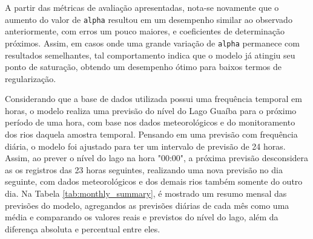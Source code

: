 A partir das métricas de avaliação apresentadas, nota-se novamente que o aumento do valor de \texttt{alpha} resultou em um desempenho similar ao observado anteriormente, com erros um pouco maiores, e coeficientes de determinação próximos. Assim, em casos onde uma grande variação de \texttt{alpha} permanece com resultados semelhantes, tal comportamento indica que o modelo já atingiu seu ponto de saturação, obtendo um desempenho ótimo para baixos termos de regularização.

Considerando que a base de dados utilizada possui uma frequência temporal em horas, o modelo realiza uma previsão do nível do Lago Guaíba para o próximo período de uma hora, com base nos dados meteorológicos e do monitoramento dos rios daquela amostra temporal. Pensando em uma previsão com frequência diária, o modelo foi ajustado para ter um intervalo de previsão de 24 horas. Assim, ao prever o nível do lago na hora "00:00", a próxima previsão desconsidera as os registros das 23 horas seguintes, realizando uma nova previsão no dia seguinte, com dados meteorológicos e dos demais rios também somente do outro dia. Na Tabela \ref{tab:monthly_summary}, é mostrado um resumo mensal das previsões do modelo, agregandos as previsões diárias de cada mês como uma média e comparando os valores reais e previstos do nível do lago, além da diferença absoluta e percentual entre eles.

